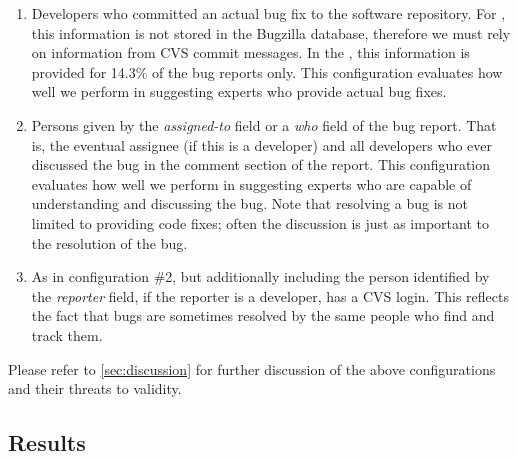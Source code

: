\begin{enumerate}
\item Developers who committed an actual bug fix to the software repository. For \EC, this information is not stored in the Bugzilla database, therefore we must rely on information from CVS commit messages. In the \validationset, this information is provided for 14.3\% of the bug reports only. This configuration evaluates how well we perform in suggesting experts who provide actual bug fixes.
\item Persons given by the \emph{assigned-to} field or a \emph{who} field of the bug report. That is, the eventual assignee (if this is a developer) and all developers who ever discussed the bug in the comment section of the report. This configuration evaluates how well we perform in suggesting experts who are capable of understanding and discussing the bug. Note that resolving a bug is not limited to providing code fixes; often the discussion is just as important to the resolution of the bug. 
\item As in configuration \#2, but additionally including the person identified by the \emph{reporter} field, if the reporter is a developer, \ie has a CVS login.  This reflects the fact that bugs are sometimes resolved by the same people who find and track them.
\end{enumerate}

Please refer to \autoref{sec:discussion} for further discussion of the above configurations and their threats to validity.

\subsection{Results}\label{therealthing}

